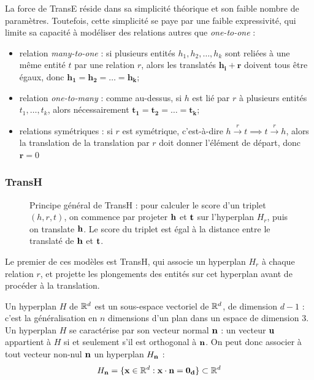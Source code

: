 {La force de TransE réside dans sa simplicité théorique et son faible nombre de paramètres. Toutefois, cette simplicité se paye par une faible expressivité, qui limite sa capacité à modéliser des relations autres que \textit{one-to-one} :
\begin{itemize}
    \item relation \textit{many-to-one} : si plusieurs entités $h_1, h_2, \ldots, h_k$ sont reliées à une même entité $t$ par une relation $r$, alors les translatés $\mathbf{h_i + r}$ doivent tous être égaux, donc $\mathbf{h_1  = h_2 = \ldots = h_k}$;
    \item relation \textit{one-to-many} : comme au-dessus, si $h$ est lié par $r$ à plusieurs entités $t_1, \ldots, t_k$, alors nécessairement $\mathbf{t_1 = t_2 = \ldots = t_k}$;
    \item relations symétriques : si $r$ est symétrique, c'est-à-dire $h  \overset{r} \rightarrow t \implies t   \overset{r} \rightarrow h$, alors la translation de la translation par $r$ doit donner l'élément de départ, donc $\mathbf{r} = 0$
\end{itemize}
}
\fi 


\subsubsection{TransH \cite{fu2014learning}}

\begin{figure}[hbt]
    \centering
    
    \caption[Principe général de TransH]{Principe général de TransH : pour calculer le score d'un triplet $(h, r, t)$, on commence par projeter $\bf{h}$ et $\bf{t}$ sur l'hyperplan $H_r$, puis on translate $\bf{h}$. Le score du triplet est égal à la distance entre le translaté de $\bf{h}$ et $\bf{t}$.}
    \label{fig:transh}
\end{figure}

Le premier de ces modèles est TransH, qui associe un hyperplan $H_r$ à chaque relation $r$, et projette les plongements des entités sur cet hyperplan avant de procéder à la translation. 

Un hyperplan $H$ de $\R^d$ est un sous-espace vectoriel de $\R^d$, de dimension $d-1$ : c'est la généralisation en $n$ dimensions d'un plan dans un espace de dimension 3. Un hyperplan $H$ se caractérise par son vecteur normal $\bf{n}$ : un vecteur $\bf{u}$ appartient à $H$ si et seulement s'il est orthogonal à $\bf{n}$. On peut donc associer à tout vecteur non-nul $\bf{n}$ un hyperplan $H_\bf{n}$ :
\begin{equation}
    H_\bf{n} = \{ \bf{x} \in \R^d : \bf{x \cdot n = 0_d} \} \subset \R^d
    \label{eq:kge-transh-hyperplane}
\end{equation}

